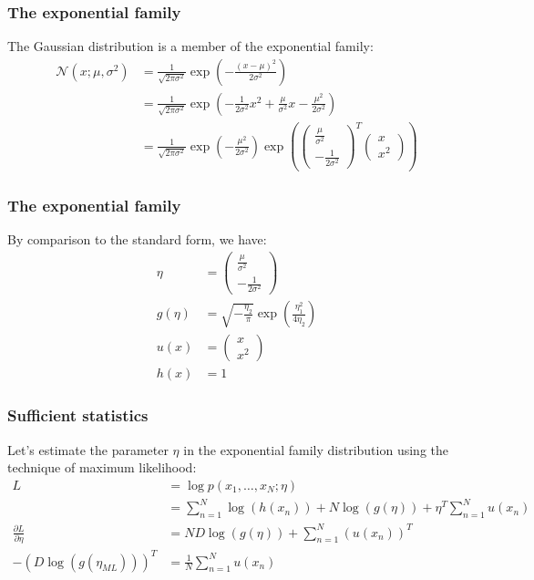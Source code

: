 \documentclass{beamer}
\begin{document}
\begin{frame}
    \frametitle{The exponential family}
    The Gaussian distribution is a member of the exponential family:
    \begin{align*}
        \mathcal{N}(x;\mu,\sigma^{2})&=\frac{1}{\sqrt{2\pi\sigma^{2}}}\exp(-\frac{(x-\mu)^2}{2\sigma^{2}}) \\
        &=\frac{1}{\sqrt{2\pi\sigma^{2}}}\exp(-\frac{1}{2\sigma^{2}}x^{2}+\frac{\mu}{\sigma^{2}}x-\frac{\mu^{2}}{2\sigma^{2}}) \\
        &=\frac{1}{\sqrt{2\pi\sigma^{2}}}\exp(-\frac{\mu^{2}}{2\sigma^{2}})\exp(\begin{pmatrix}
            \frac{\mu}{\sigma^{2}} \\
            -\frac{1}{2\sigma^{2}}
        \end{pmatrix}^{T}\begin{pmatrix}
            x \\
            x^{2}
        \end{pmatrix})
    \end{align*}
\end{frame}

\begin{frame}
    \frametitle{The exponential family}
    By comparison to the standard form, we have:
    \begin{align*}
        \eta&=\begin{pmatrix}
            \frac{\mu}{\sigma^{2}} \\
            -\frac{1}{2\sigma^{2}}
        \end{pmatrix} \\
        g(\eta)&=\sqrt{-\frac{\eta_{2}}{\pi}}\exp(\frac{\eta_{1}^{2}}{4\eta_{2}}) \\
        u(x)&=\begin{pmatrix}
            x \\
            x^{2}
        \end{pmatrix} \\
        h(x)&=1
    \end{align*}
\end{frame}

\begin{frame}
    \frametitle{Sufficient statistics}
    Let's estimate the parameter $\eta$ in the exponential family distribution using the technique of maximum likelihood:
    \begin{align*}
        L&=\log{}p(x_{1},\hdots,x_{N};\eta) \\
        &=\sum_{n=1}^{N}\log(h(x_{n}))+N\log(g(\eta))+\eta^{T}\sum_{n=1}^{N}u(x_{n}) \\
        \frac{\partial{}L}{\partial\eta}&=ND\log(g(\eta))+\sum_{n=1}^{N}(u(x_{n}))^{T} \\
        -(D\log(g(\eta_{ML})))^{T}&=\frac{1}{N}\sum_{n=1}^{N}u(x_{n})
    \end{align*}
\end{frame}
\end{document}
